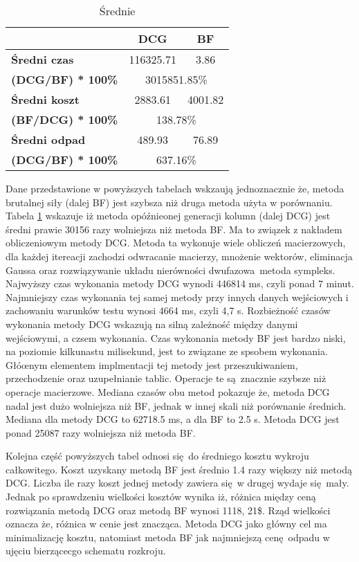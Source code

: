 \begin{table}[]
\centering
\caption{Średnie}
\label{tab:average}
\begin{tabular}{|l|c|c|}
\hline
                                           & \textbf{DCG}   & \textbf{BF}   \\ \hline
\textbf{Średni czas}                       & 116325.71      & 3.86          \\ \hline
\textbf{(DCG/BF) * 100\%}  & \multicolumn{2}{c|}{3015851.85\%} \\ \hline
\textbf{Średni koszt}                      & 2883.61        & 4001.82       \\ \hline
\textbf{(BF/DCG) * 100\%} & \multicolumn{2}{c|}{138.78\%}  \\ \hline
\textbf{Średni odpad}                      & 489.93         & 76.89         \\ \hline
\textbf{(DCG/BF) * 100\%} & \multicolumn{2}{c|}{637.16\%}    \\ \hline
\end{tabular}
\end{table}

Dane przedstawione w powyższych tabelach wskzaują jednoznacznie że, metoda brutalnej siły (dalej BF) jest szybsza niż druga metoda użyta w porównaniu. Tabela \ref{tab:average} wskazuje iż metoda opóźnieonej generacji kolumn (dalej DCG) jest średni prawie 30156 razy wolniejsza niż metoda BF. Ma to związek z nakładem obliczeniowym metody DCG. Metoda ta wykonuje wiele obliczeń macierzowych, dla każdej itereacji zachodzi odwracanie macierzy, mnożenie wektorów, eliminacja Gaussa oraz rozwiązywanie układu nierówności dwufazowa metoda sympleks. Najwyższy czas wykonania metody DCG wynodi 446814 ms, czyli ponad 7 minut. Najmniejszy czas wykonania tej samej metody przy innych danych wejściowych i zachowaniu warunków testu wynosi 4664 ms, czyli 4,7 s. Rozbieżność czasów wykonania metody DCG wskazują na silną zależność między danymi wejściowymi, a czsem wykonania. Czas wykonania metody BF jest bardzo niski, na poziomie kilkunastu milisekund, jest to związane ze spsobem wykonania. Głóœnym elementem implmentacji tej metody jest przeszukiwaniem, przechodzenie oraz uzupełnianie tablic. Operacje te są znacznie szybsze niż operacje macierzowe. Mediana czasów obu metod pokazuje że, metoda DCG nadal jest dużo wolniejsza niż BF, jednak w innej skali niż porównanie średnich. Mediana dla metody DCG to 62718.5 ms, a dla BF to 2.5 s. Metoda DCG jest ponad 25087 razy wolniejsza niż metoda BF.

Kolejna część powyższych tabel odnosi się do średniego kosztu wykroju całkowitego. Koszt uzyskany metodą BF jest średnio 1.4 razy większy niż metodą DCG. Liczba ile razy koszt jednej metody zawiera się w drugej wydaje się mały. Jednak po sprawdzeniu wielkości kosztów wynika iż, różnica między ceną rozwiązania metodą DCG oraz metodą BF wynosi 1118, 21\$. Rząd wielkości oznacza że, różnica w cenie jest znacząca. Metoda DCG jako główny cel ma minimalizację kosztu, natomiast metoda BF jak najmniejszą cenę odpadu w ujęciu bierzącecgo schematu rozkroju.

